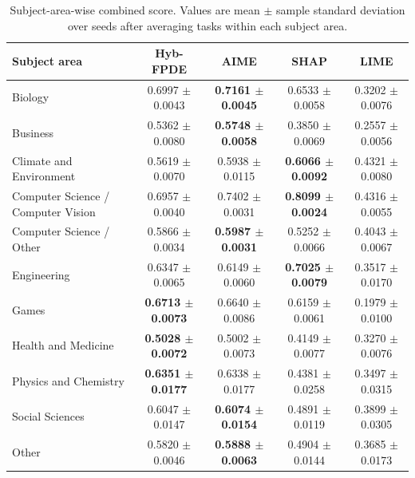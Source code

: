 \begin{table}[!tbp]
    \caption{Subject-area-wise combined score. Values are mean $\pm$ sample standard deviation over seeds after averaging tasks within each subject area.}
    \label{tab:subject_area_combined_scores}
    \centering
    \scriptsize
    \setlength{\tabcolsep}{3pt}
    \begin{tabular}{lcccc}
        \toprule
        Subject area & Hyb-FPDE & AIME & SHAP & LIME  \\
        \midrule
        Biology & 0.6997 $\pm$ 0.0043 & \textbf{0.7161 $\pm$ 0.0045} & 0.6533 $\pm$ 0.0058 & 0.3202 $\pm$ 0.0076 \\
        Business & 0.5362 $\pm$ 0.0080 & \textbf{0.5748 $\pm$ 0.0058} & 0.3850 $\pm$ 0.0069 & 0.2557 $\pm$ 0.0056 \\
        Climate and Environment & 0.5619 $\pm$ 0.0070 & 0.5938 $\pm$ 0.0115 & \textbf{0.6066 $\pm$ 0.0092} & 0.4321 $\pm$ 0.0080 \\
        Computer Science / Computer Vision & 0.6957 $\pm$ 0.0040 & 0.7402 $\pm$ 0.0031 & \textbf{0.8099 $\pm$ 0.0024} & 0.4316 $\pm$ 0.0055 \\
        Computer Science / Other & 0.5866 $\pm$ 0.0034 & \textbf{0.5987 $\pm$ 0.0031} & 0.5252 $\pm$ 0.0066 & 0.4043 $\pm$ 0.0067 \\
        Engineering & 0.6347 $\pm$ 0.0065 & 0.6149 $\pm$ 0.0060 & \textbf{0.7025 $\pm$ 0.0079} & 0.3517 $\pm$ 0.0170 \\
        Games & \textbf{0.6713 $\pm$ 0.0073} & 0.6640 $\pm$ 0.0086 & 0.6159 $\pm$ 0.0061 & 0.1979 $\pm$ 0.0100 \\
        Health and Medicine & \textbf{0.5028 $\pm$ 0.0072} & 0.5002 $\pm$ 0.0073 & 0.4149 $\pm$ 0.0077 & 0.3270 $\pm$ 0.0076 \\
        Physics and Chemistry & \textbf{0.6351 $\pm$ 0.0177} & 0.6338 $\pm$ 0.0177 & 0.4381 $\pm$ 0.0258 & 0.3497 $\pm$ 0.0315 \\
        Social Sciences & 0.6047 $\pm$ 0.0147 & \textbf{0.6074 $\pm$ 0.0154} & 0.4891 $\pm$ 0.0119 & 0.3899 $\pm$ 0.0305 \\
        Other & 0.5820 $\pm$ 0.0046 & \textbf{0.5888 $\pm$ 0.0063} & 0.4904 $\pm$ 0.0144 & 0.3685 $\pm$ 0.0173 \\
        \bottomrule
    \end{tabular}
\end{table}
